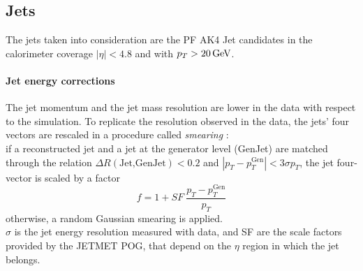 \subsection{Jets}\label{sec:jet}
The jets taken into consideration are the PF AK4 Jet candidates in the calorimeter coverage $|\eta|<4.8$ and with $p_T>20{\,\text{Ge\hspace{-.08em}V}}$.

\paragraph*{Jet energy corrections}
The jet momentum and the jet mass resolution are lower in the data with respect to the simulation. To replicate the resolution observed in the data, the jets' four vectors are rescaled in a procedure called \emph{smearing} \cite{2021Jet13TeV}:\\
if a reconstructed jet and a jet at the generator level (GenJet) are matched through the relation $\Delta R(\text{Jet,GenJet})<0.2$ and $|p_T-p_T^{\text{Gen}}|<3\sigma p_T$, the jet four-vector is scaled by a factor
\begin{equation}
    f=1+\textit{SF}\:\frac{p_T-p_T^{\text{Gen}}}{p_T}
\end{equation}
otherwise, a random Gaussian smearing is applied.\\
$\sigma$ is the jet energy resolution measured with data, and SF are the scale factors provided by the JETMET POG, that depend on the $\eta$ region in which the jet belongs.

